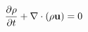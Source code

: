 \documentclass[preview]{standalone}
\begin{document}
\begin{align*}
\special{dvisvgm:raw <g id='unique000'>}\pdv{\rho}{t}+\nabla\cdot(\rho\va u)=0\special{dvisvgm:raw </g>}
\end{align*}
\end{document}
